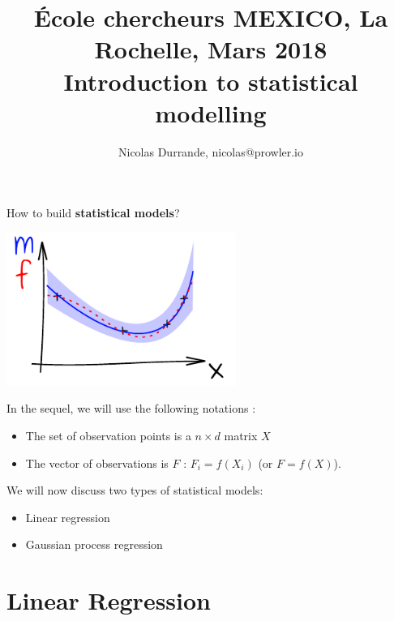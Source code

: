 \documentclass{beamer}
\title[\'Ecole chercheurs MEXICO]{ \small \'Ecole chercheurs MEXICO, La Rochelle, Mars 2018\\ \vspace{3mm} \LARGE Introduction to statistical modelling}
\author[\quad La Rochelle, March 2018]{Nicolas Durrande, nicolas@prowler.io}
\institute[]{PROWLER.io, Cambridge -- Mines St-\'Etienne}
\date{\null}
\begin{document}
\begin{frame}
  \titlepage
\end{frame}

\begin{frame}{}
How to build \textbf{statistical models}? 
\begin{center}
\includegraphics[height=5cm]{figures/ink_mconfint}
\end{center}
\end{frame}

\begin{frame}{}
In the sequel, we will use the following notations : 
\begin{itemize}
	\item The set of observation points is a $n \times d$ matrix $X$
	\item The vector of observations is $F$ : $F_i=f(X_i)$ (or $F=f(X)$).
\end{itemize}
\vspace{5mm}
We will now discuss two types of statistical models:
\begin{itemize}
	\item Linear regression
	\item Gaussian process regression
\end{itemize}
\end{frame}

\section{Linear Regression}
\subsection{}
\end{document}
